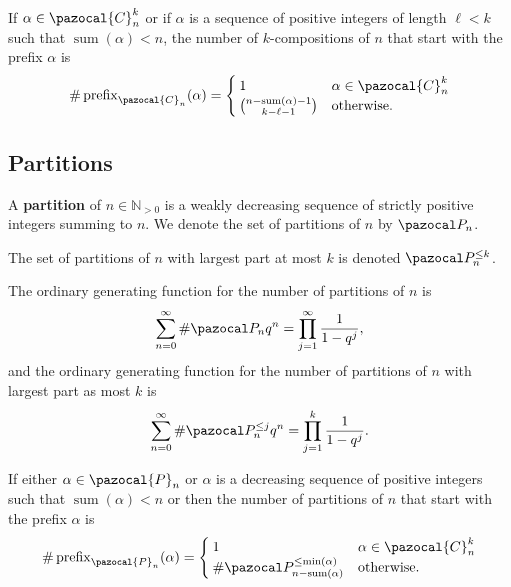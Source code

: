 \begin{proposition}
  If $\alpha \in \pazocal{C}_n^{k}$ or if $\alpha$ is
  a sequence of positive integers of length $\ell < k$ such that
  ${\operatorname{sum}(\alpha) < n}$,
  the number of $k$-compositions of $n$ that start with the prefix $\alpha$
  is \begin{equation}
    \#\operatorname{prefix}_{\pazocal{C}_n}(\alpha) = \begin{cases}
      1 & \alpha \in \pazocal{C}_n^{k} \\
      \binom{n - \operatorname{sum}(\alpha) - 1}{k - \ell - 1} & \text{otherwise}.
    \end{cases}
  \end{equation}
\end{proposition}

\subsection{Partitions}
\begin{definition}
  A \textbf{partition} of $n \in \mathbb{N}_{>0}$ is a weakly decreasing
  sequence of strictly positive integers summing to $n$. We denote the set of
  partitions of $n$ by $\pazocal P_n$.

  The set of partitions of $n$ with largest part at most
  $k$ is denoted $\pazocal P_n^{\leq k}$.
\end{definition}

\begin{lemma}
  The ordinary generating function for the number of partitions of $n$ is \begin{equation}
    \sum_{n=0}^\infty \#\pazocal P_n q^n = \prod_{j=1}^\infty \frac{1}{1-q^j},
  \end{equation}
  and the ordinary generating function for the number of partitions of $n$ with largest part
  as most $k$ is \begin{equation}
    \sum_{n=0}^\infty \#\pazocal P_n^{\leq j} q^n = \prod_{j=1}^k \frac{1}{1-q^j}.
  \end{equation}
\end{lemma}

\begin{proposition}
  If either $\alpha \in \pazocal{P}_n$ or $\alpha$ is
  a decreasing sequence of positive integers such that
  ${\operatorname{sum}(\alpha) < n}$ or
  then the number of partitions of $n$ that start with the prefix $\alpha$
  is \begin{equation}
    \#\operatorname{prefix}_{\pazocal{P}_n}(\alpha) = \begin{cases}
      1 & \alpha \in \pazocal{C}_n^{k} \\
      \#\pazocal P_{n-\operatorname{sum}(\alpha)}^{\leq \operatorname{min}(\alpha)} & \text{otherwise}.
    \end{cases}
  \end{equation}
\end{proposition}

